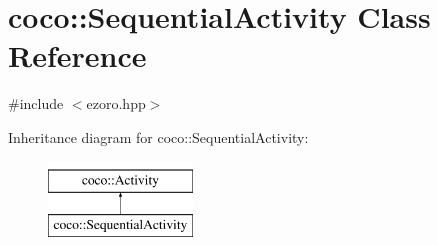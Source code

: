 \hypertarget{classcoco_1_1_sequential_activity}{\section{coco\-:\-:Sequential\-Activity Class Reference}
\label{classcoco_1_1_sequential_activity}
}


{\ttfamily \#include $<$ezoro.\-hpp$>$}

Inheritance diagram for coco\-:\-:Sequential\-Activity\-:\begin{figure}[H]
\begin{center}
\leavevmode
\includegraphics[height=2.000000cm]{classcoco_1_1_sequential_activity}
\end{center}
\end{figure}
